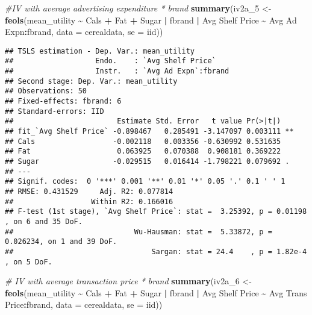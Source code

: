 \documentclass[
]{article}
\newenvironment{Shaded}{\begin{snugshade}}{\end{snugshade}}
\newcommand{\AttributeTok}[1]{\textcolor[rgb]{0.13,0.29,0.53}{#1}}
\newcommand{\CommentTok}[1]{\textcolor[rgb]{0.56,0.35,0.01}{\textit{#1}}}
\newcommand{\FunctionTok}[1]{\textcolor[rgb]{0.13,0.29,0.53}{\textbf{#1}}}
\newcommand{\NormalTok}[1]{#1}
\newcommand{\OtherTok}[1]{\textcolor[rgb]{0.56,0.35,0.01}{#1}}
\newcommand{\SpecialCharTok}[1]{\textcolor[rgb]{0.81,0.36,0.00}{\textbf{#1}}}
\newcommand{\StringTok}[1]{\textcolor[rgb]{0.31,0.60,0.02}{#1}}
\begin{document}
\begin{Shaded}
\begin{Highlighting}[]
\CommentTok{\#IV with average advertising expenditure * brand}
\FunctionTok{summary}\NormalTok{(iv2a\_5 }\OtherTok{\textless{}{-}} \FunctionTok{feols}\NormalTok{(mean\_utility }\SpecialCharTok{\textasciitilde{}}\NormalTok{ Cals }\SpecialCharTok{+}\NormalTok{ Fat }\SpecialCharTok{+}\NormalTok{ Sugar }\SpecialCharTok{|}\NormalTok{ fbrand }\SpecialCharTok{|} \StringTok{\textasciigrave{}}\AttributeTok{Avg Shelf Price}\StringTok{\textasciigrave{}} \SpecialCharTok{\textasciitilde{}} \StringTok{\textasciigrave{}}\AttributeTok{Avg Ad Expn}\StringTok{\textasciigrave{}}\SpecialCharTok{:}\NormalTok{fbrand,}
                        \AttributeTok{data =}\NormalTok{ cerealdata, }\AttributeTok{se =} \StringTok{\textquotesingle{}iid\textquotesingle{}}\NormalTok{))}
\end{Highlighting}
\end{Shaded}

\begin{verbatim}
## TSLS estimation - Dep. Var.: mean_utility
##                   Endo.    : `Avg Shelf Price`
##                   Instr.   : `Avg Ad Expn`:fbrand
## Second stage: Dep. Var.: mean_utility
## Observations: 50
## Fixed-effects: fbrand: 6
## Standard-errors: IID 
##                        Estimate Std. Error   t value Pr(>|t|)    
## fit_`Avg Shelf Price` -0.898467   0.285491 -3.147097 0.003111 ** 
## Cals                  -0.002118   0.003356 -0.630992 0.531635    
## Fat                    0.063925   0.070388  0.908181 0.369222    
## Sugar                 -0.029515   0.016414 -1.798221 0.079692 .  
## ---
## Signif. codes:  0 '***' 0.001 '**' 0.01 '*' 0.05 '.' 0.1 ' ' 1
## RMSE: 0.431529     Adj. R2: 0.077814
##                  Within R2: 0.166016
## F-test (1st stage), `Avg Shelf Price`: stat =  3.25392, p = 0.01198 , on 6 and 35 DoF.
##                            Wu-Hausman: stat =  5.33872, p = 0.026234, on 1 and 39 DoF.
##                                Sargan: stat = 24.4    , p = 1.82e-4 , on 5 DoF.
\end{verbatim}

\begin{Shaded}
\begin{Highlighting}[]
\CommentTok{\#  IV with  average transaction price * brand}
\FunctionTok{summary}\NormalTok{(iv2a\_6 }\OtherTok{\textless{}{-}} \FunctionTok{feols}\NormalTok{(mean\_utility }\SpecialCharTok{\textasciitilde{}}\NormalTok{ Cals }\SpecialCharTok{+}\NormalTok{ Fat }\SpecialCharTok{+}\NormalTok{ Sugar }\SpecialCharTok{|}\NormalTok{ fbrand }\SpecialCharTok{|} \StringTok{\textasciigrave{}}\AttributeTok{Avg Shelf Price}\StringTok{\textasciigrave{}} \SpecialCharTok{\textasciitilde{}} \StringTok{\textasciigrave{}}\AttributeTok{Avg Trans Price}\StringTok{\textasciigrave{}}\SpecialCharTok{:}\NormalTok{fbrand, }
                        \AttributeTok{data =}\NormalTok{ cerealdata, }\AttributeTok{se =} \StringTok{\textquotesingle{}iid\textquotesingle{}}\NormalTok{))}
\end{Highlighting}
\end{Shaded}
\end{document}
